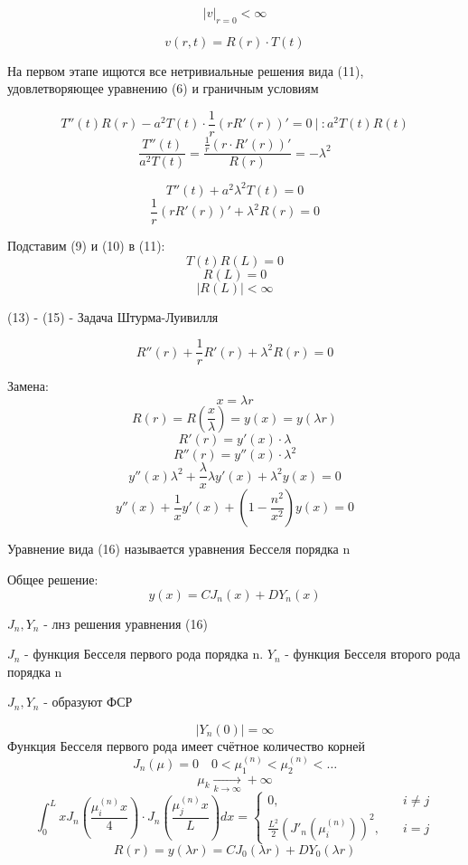 \documentclass[a4paper]{article}
\begin{document}
\begin{equation}
    |v|_{r=0} < \infty
\end{equation}

\begin{equation}
    v(r,t) = R(r) \cdot T(t)
\end{equation}

На первом этапе ищются все нетривиальные решения вида (11), удовлетворяющее
уравнению (6) и граничным условиям

\[
    T''(t)R(r) - a^2 T(t) \cdot \frac{1}{r} (r R'(r))' = 0 \ | \ : a^2 T(t) R(t)
\]
\[
    \frac{T''(t)}{a^2T(t)}  = \frac{\frac{1}{r} (r \cdot R'(r))'}{R(r)} 
    = - \lambda^2
\]

\begin{equation}
    T''(t) + a^2 \lambda^2 T(t) = 0
\end{equation}
\begin{equation}
    \frac{1}{r} (r R'(r))' + \lambda^2 R(r) = 0
\end{equation}

Подставим (9) и (10) в (11):
\[
    T(t)R(L) = 0
\]
\begin{equation}
    R(L) = 0
\end{equation}
\begin{equation}
    |R(L)| < \infty
\end{equation}

(13) - (15) - Задача Штурма-Луивилля

\[
    R''(r) + \frac{1}{r} R'(r) + \lambda^2 R(r) = 0
\]

Замена:
\[
    x = \lambda r
\]
\[
    R(r) = R \left(\frac{x}{\lambda} \right) = y(x) = y(\lambda r)
\]
\[
    R'(r) = y'(x) \cdot \lambda
\]
\[
    R''(r) = y''(x) \cdot \lambda^2
\]
\[
    y''(x) \lambda^2 + \frac{\lambda}{x} \lambda y'(x) + \lambda^2 y(x) = 0
\]
\begin{equation}
    y''(x) + \frac{1}{x} y'(x) + \left(1 - \frac{n^2}{x^2}\right)y(x) = 0
\end{equation}

Уравнение вида (16) называется уравнения Бесселя порядка n

Общее решение:
\[
    y(x) = C J_n(x) + D Y_n(x)
\]

$ J_n, Y_n $ - лнз решения уравнения (16)

$ J_n $ - функция Бесселя первого рода порядка n. $ Y_n $ - функция Бесселя второго рода порядка n

$ J_n, Y_n $ - образуют ФСР

\[
    |Y_n(0)| = \infty
\]
Функция Бесселя первого рода имеет счётное количество корней
\[
    J_n(\mu) = 0 \quad 0 < \mu_1^{(n)} < \mu_2^{(n)} < \dots
\]
\[
    \mu_k \xrightarrow[k \to \infty]{} + \infty
\]
\begin{equation}
    \int_{0}^{L} x J_n \left(\frac{\mu_i^{(n)} x}{4} \right) \cdot J_n
    \left(\frac{\mu_j^{(n)} x}{L} \right) dx = 
    \begin{cases}
        0, &\quad i \neq j\\
        \frac{L^2}{2} (J'_n(\mu_i^{(n)}))^2, &\quad i = j
    \end{cases}
\end{equation}
\[
    R(r) = y(\lambda r) = C J_0(\lambda r) + D Y_0(\lambda r)
\]
\end{document}
